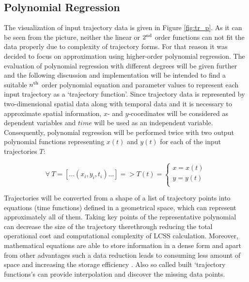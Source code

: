 \subsection{Polynomial Regression}

The visualization of input trajectory data is given in Figure \ref{fig:tr_p}. As it can be seen from the picture, neither the linear or $2\textsuperscript{nd}$ order functions can not fit the data properly due to complexity of trajectory forms. For that reason it was decided to focus on approximation using higher-order polynomial regression. The evaluation of polynomial regression with different degrees will be given further and the following discussion and implementation will be intended to find a suitable $n\textsuperscript{th}$ order polynomial equation and parameter values to represent each input trajectory as a `trajectory function'. Since trajectory data is represented by two-dimensional spatial data along with temporal data and it is necessary to approximate spatial information, $x$- and $y$-coordinates will be considered as dependent variables and $time$ will be used as an independent variable. Consequently, polynomial regression will be performed twice with two output polynomial functions representing $x(t)$ and $y(t)$ for each of the input trajectories $T$:

\begin{equation}\label{eq:regr-func}
	\forall\ T = [\ldots (x_i, y_i, t_i) \ldots] = > T(t) = 
		\begin{cases}
			x = x(t) \\
			y = y(t) \\
		\end{cases}
\end{equation}

Trajectories will be converted from a shape of a list of trajectory points into equations (time functions) defined in a geometrical space, which can represent approximately all of them. Taking key points of the representative polynomial can decrease the size of the trajectory therethrough reducing the total operational cost and computational complexity of LCSS calculation. Moreover, mathematical equations are able to store information in a dense form and apart from other advantages such a data reduction leads to consuming less amount of space and increasing the storage efficiency \cite{article:behav_form_extr}. Also so called built `trajectory functions's can provide interpolation and discover the missing data points.

